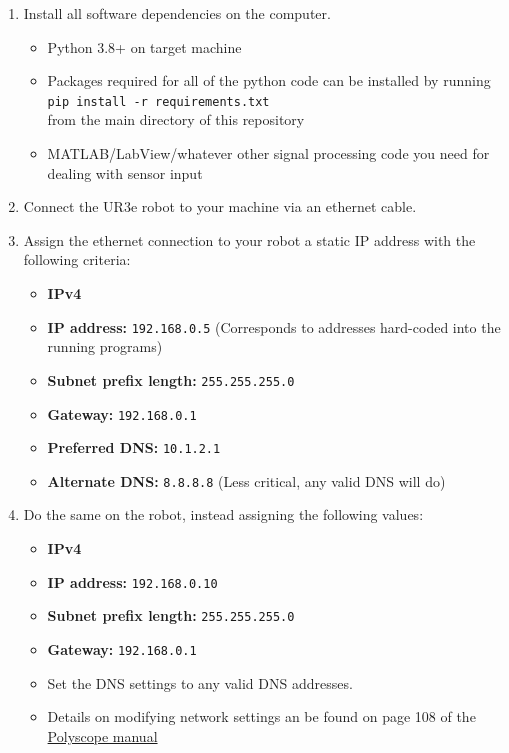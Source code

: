 \documentclass[11pt]{article}
\begin{document}
\begin{enumerate}
    \item Install all software dependencies on the computer.
    \begin{itemize}
        \item Python 3.8+ on target machine
        \item Packages required for all of the python code can be installed by running \\ \texttt{pip install -r requirements.txt} \\ from the main directory of this repository
        \item MATLAB/LabView/whatever other signal processing code you need for dealing with sensor input
    \end{itemize}
    \item Connect the UR3e robot to your machine via an ethernet cable.
    \item Assign the ethernet connection to your robot a static IP address with the following criteria:
    \begin{itemize}
        \item \textbf{IPv4}
        \item \textbf{IP address:} \texttt{192.168.0.5} (Corresponds to addresses hard-coded into the running programs)
        \item \textbf{Subnet prefix length:} \texttt{255.255.255.0}
        \item \textbf{Gateway:} \texttt{192.168.0.1}
        \item \textbf{Preferred DNS:}  \texttt{10.1.2.1}
        \item \textbf{Alternate DNS:} \texttt{8.8.8.8} (Less critical, any valid DNS will do)
    \end{itemize}
    \item Do the same on the robot, instead assigning the following values:
    \begin{itemize}
        \item \textbf{IPv4}
        \item \textbf{IP address:} \texttt{192.168.0.10}
        \item \textbf{Subnet prefix length:} \texttt{255.255.255.0}
        \item \textbf{Gateway:} \texttt{192.168.0.1}
        \item Set the DNS settings to any valid DNS addresses.
        \item Details on modifying network settings an be found on page 108 of the \hyperlink{https://s3-eu-west-1.amazonaws.com/ur-support-site/44018/Software_Manual_en_Global.pdf\#page=108}{Polyscope manual}

\end{itemize}
\end{enumerate}
\end{document}
